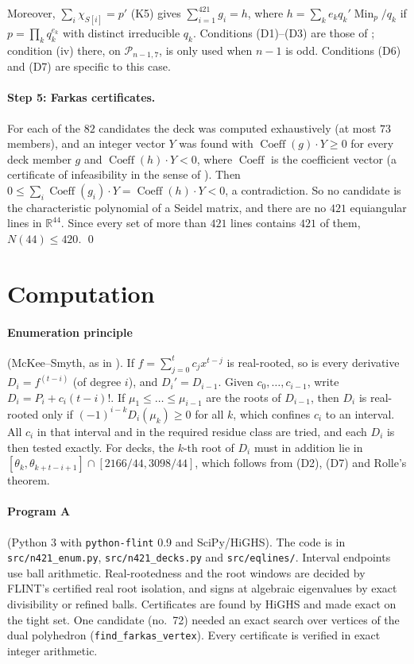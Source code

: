 \documentclass[11pt]{article}
\theoremstyle{definition}
\newcommand{\R}{\mathbb{R}}
\newcommand{\Min}{\operatorname{Min}}
\begin{document}
Moreover, $\sum_i\chi_{S[i]}=p'$ (K5) gives $\sum_{i=1}^{421}g_i=h$, where
$h=\sum_k e_kq_k'\Min_p/q_k$ if $p=\prod_kq_k^{e_k}$ with distinct irreducible $q_k$. Conditions
(D1)--(D3) are those of \cite[\S5]{GSY23}; condition (iv) there, on $\mathcal P_{n-1,7}$, is only
used when $n-1$ is odd. Conditions (D6) and (D7) are specific to this case.

\paragraph{Step 5: Farkas certificates.} For each of the $82$ candidates the deck was computed
exhaustively (at most $73$ members), and an integer vector $Y$ was found with
$\operatorname{Coeff}(g)\cdot Y\ge0$ for every deck member $g$ and $\operatorname{Coeff}(h)\cdot Y<0$,
where $\operatorname{Coeff}$ is the coefficient vector (a certificate of infeasibility in the sense of
\cite[\S5]{GSY23}). Then $0\le\sum_i\operatorname{Coeff}(g_i)\cdot Y=\operatorname{Coeff}(h)\cdot Y<0$, a
contradiction. So no candidate is the characteristic polynomial of a Seidel matrix, and there are no
$421$ equiangular lines in $\R^{44}$. Since every set of more than $421$ lines contains $421$ of them,
$N(44)\le420$. \qed

\section{Computation}\label{sec:comp}

\paragraph{Enumeration principle} (McKee--Smyth, as in \cite[\S2.3]{GSY21}). If
$f=\sum_{j=0}^tc_jx^{t-j}$ is real-rooted, so is every derivative $D_i=f^{(t-i)}$ (of degree $i$),
and $D_i'=D_{i-1}$. Given $c_0,\dots,c_{i-1}$, write $D_i=P_i+c_i(t-i)!$. If
$\mu_1\le\dots\le\mu_{i-1}$ are the roots of $D_{i-1}$, then $D_i$ is real-rooted only if
$(-1)^{i-k}D_i(\mu_k)\ge0$ for all $k$, which confines $c_i$ to an interval. All $c_i$ in that interval
and in the required residue class are tried, and each $D_i$ is then tested exactly. For decks, the
$k$-th root of $D_i$ must in addition lie in $[\theta_k,\theta_{k+t-i+1}]\cap[2166/44,3098/44]$, which
follows from (D2), (D7) and Rolle's theorem.

\paragraph{Program A} (Python 3 with \texttt{python-flint} 0.9 and SciPy/HiGHS). The code is in
\texttt{src/n421\_enum.py}, \texttt{src/n421\_decks.py} and \texttt{src/eqlines/}. Interval endpoints use
ball arithmetic.
Real-rootedness and the root windows are decided by FLINT's certified real root isolation, and signs
at algebraic eigenvalues by exact divisibility or refined balls. Certificates are found by HiGHS and
made exact on the tight set. One candidate (no.~72) needed an exact search over vertices of the dual
polyhedron (\texttt{find\_farkas\_vertex}). Every certificate is verified in exact integer arithmetic.
\end{document}
